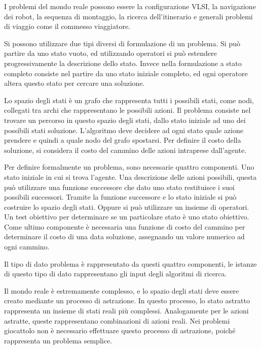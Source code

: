 \documentclass{article}
\numberwithin{equation}{subsection}
\begin{document}
I problemi del mondo reale possono essere la configurazione VLSI, la navigazione dei robot, 
la sequenza di montaggio, la ricerca dell'itinerario e generali problemi di viaggio come il 
commesso viaggiatore. 



Si possono utilizzare due tipi diversi di formulazione di un problema. Si può partire da uno 
stato vuoto, ed utilizzando operatori si può estendere progressivamente la descrizione 
dello stato. 
Invece nella formulazione a stato completo consiste nel partire da uno stato iniziale completo, 
ed ogni operatore altera questo stato per cercare una soluzione. 


Lo spazio degli stati è un grafo che rappresenta tutti i possibili stati, come nodi, collegati 
tra archi che rappresentano le possibili azioni. Il problema consiste nel trovare un 
percorso in questo spazio degli stati, dallo stato iniziale ad uno dei possibili stati 
soluzione. L'algoritmo deve decidere ad ogni stato quale azione prendere e quindi a quale nodo 
del grafo spostarsi. 
Per definire il costo della soluzione, si considera il costo del cammino delle azioni 
intraprese dall'agente. 

Per definire formalmente un problema, sono necessarie quattro componenti. Uno stato iniziale 
in cui si trova l'agente. Una descrizione delle azioni possibili, questa può utilizzare una 
funzione successore che dato uno stato restituisce i suoi possibili successori. Tramite la 
funzione successore e lo stato iniziale si può costruire lo spazio degli stati. Oppure si 
può utilizzare un insieme di operatori. Un test obiettivo per determinare se un particolare 
stato è uno stato obiettivo. Come ultimo componente è necessaria una funzione di costo del 
cammino per determinare il costo di una data soluzione, assegnando un valore numerico ad 
ogni cammino. 

Il tipo di dato problema è rappresentato da questi quattro componenti, le istanze di questo 
tipo di dato rappresentano gli input degli algoritmi di ricerca. 


Il mondo reale è estremamente complesso, e lo spazio degli stati deve essere creato mediante un 
processo di astrazione. In questo processo, lo stato astratto rappresenta un insieme di 
stati reali più complessi. Analogamente per le azioni astratte, queste rappresentano combinazioni 
di azioni reali. Nei problemi giocattolo non è necessario effettuare questo processo di astrazione, 
poiché rappresenta un problema semplice. 
\end{document}
